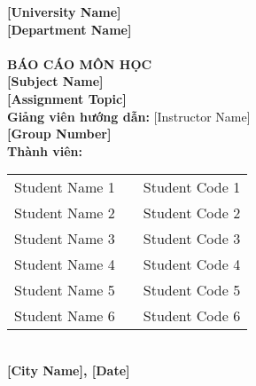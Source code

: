 \begin{titlepage}
    \centering
    \vspace*{0.75cm}
    {\Large \textbf{[University Name]}}\\[0.3cm]
    {\Large \textbf{[Department Name]}}\\[1cm]
    
    \centering{}\\[1cm]
    
    {\Large \textbf{BÁO CÁO MÔN HỌC}}\\[0.5cm]
    {\Large \textbf{[Subject Name]}}\\[0.75cm]
    {\Large \textbf{[Assignment Topic]}}\\[1.5cm]
    
    {\large \textbf{Giảng viên hướng dẫn:} [Instructor Name]}\\[0.5cm]
    {\large \textbf{[Group Number]}}\\[1cm]
    
    {\large \textbf{Thành viên:}}\\[0.5cm]
    \begin{tabular}{>{\raggedright}p{5cm}p{0cm}p{4cm}}
        {Student Name 1} & & {Student Code 1}\\
        {Student Name 2} & & {Student Code 2}\\
        {Student Name 3} & & {Student Code 3}\\
        {Student Name 4} & & {Student Code 4}\\
        {Student Name 5} & & {Student Code 5}\\
        {Student Name 6} & & {Student Code 6}\\
    \end{tabular}\\[2cm]
    
    \textbf{[City Name], [Date]}
\end{titlepage}